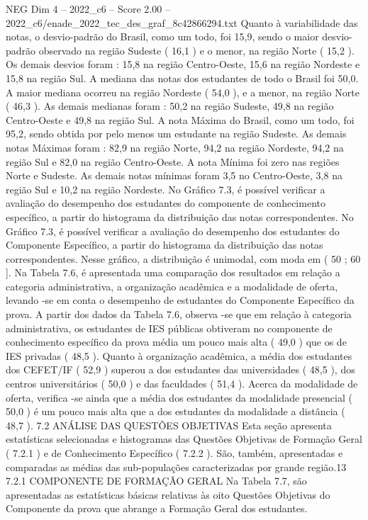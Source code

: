 \begin{textsample}{NEG Dim 4 – 2022\_c6 – Score 2.00 – 2022\_c6/enade\_2022\_tec\_des\_graf\_8c42866294.txt}
Quanto à variabilidade das notas, o desvio-padrão do Brasil, como um todo, foi 15,9, sendo o maior desvio-padrão observado na região Sudeste ( 16,1 ) e o menor, na região Norte ( 15,2 ).
Os demais desvios foram : 15,8 na região Centro-Oeste, 15,6 na região Nordeste e 15,8 na região Sul.
A mediana das notas dos estudantes de todo o Brasil foi 50,0.
A maior mediana ocorreu na região Nordeste ( 54,0 ), e a menor, na região Norte ( 46,3 ).
As demais medianas foram : 50,2 na região Sudeste, 49,8 na região Centro-Oeste e 49,8 na região Sul.
A nota Máxima do Brasil, como um todo, foi 95,2, sendo obtida por pelo menos um estudante na região Sudeste.
As demais notas Máximas foram : 82,9 na região Norte, 94,2 na região Nordeste, 94,2 na região Sul e 82,0 na região Centro-Oeste.
A nota Mínima foi zero nas regiões Norte e Sudeste.
As demais notas mínimas foram 3,5 no Centro-Oeste, 3,8 na região Sul e 10,2 na região Nordeste.
No Gráfico 7.3, é possível verificar a avaliação do desempenho dos estudantes do componente de conhecimento específico, a partir do histograma da distribuição das notas correspondentes.
No Gráfico 7.3, é possível verificar a avaliação do desempenho dos estudantes do Componente Específico, a partir do histograma da distribuição das notas correspondentes.
Nesse gráfico, a distribuição é unimodal, com moda em ( 50 ; 60 ].
Na Tabela 7.6, é apresentada uma comparação dos resultados em relação a categoria administrativa, a organização acadêmica e a modalidade de oferta, levando -se em conta o desempenho de estudantes do Componente Específico da prova.
A partir dos dados da Tabela 7.6, observa -se que em relação à categoria administrativa, os estudantes de IES públicas obtiveram no componente de conhecimento específico da prova média um pouco mais alta ( 49,0 ) que os de IES privadas ( 48,5 ).
Quanto à organização acadêmica, a média dos estudantes dos CEFET/IF ( 52,9 ) superou a dos estudantes das universidades ( 48,5 ), dos centros universitários ( 50,0 ) e das faculdades ( 51,4 ).
Acerca da modalidade de oferta, verifica -se ainda que a média dos estudantes da modalidade presencial ( 50,0 ) é um pouco mais alta que a dos estudantes da modalidade a distância ( 48,7 ). 7.2 ANÁLISE DAS QUESTÕES OBJETIVAS Esta seção apresenta estatísticas selecionadas e histogramas das Questões Objetivas de Formação Geral ( 7.2.1 ) e de Conhecimento Específico ( 7.2.2 ).
São, também, apresentadas e comparadas as médias das sub-populações caracterizadas por grande região.13 7.2.1 COMPONENTE DE FORMAÇÃO GERAL Na Tabela 7.7, são apresentadas as estatísticas básicas relativas às oito Questões Objetivas do Componente da prova que abrange a Formação Geral dos estudantes.

\end{textsample}
